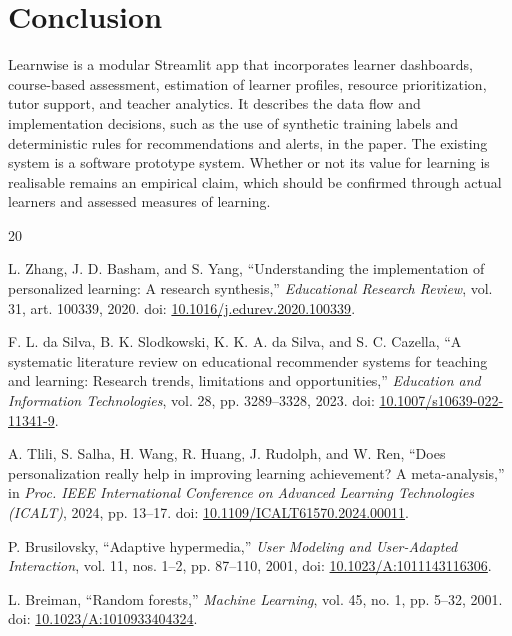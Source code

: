 \documentclass[conference]{IEEEtran}
\begin{document}
\section{Conclusion}
Learnwise is a modular Streamlit app that incorporates learner dashboards, course-based assessment, estimation of learner profiles, resource prioritization, tutor support, and teacher analytics. It describes the data flow and implementation decisions, such as the use of synthetic training labels and deterministic rules for recommendations and alerts, in the paper. The existing system is a software prototype system. Whether or not its value for learning is realisable remains an empirical claim, which should be confirmed through actual learners and assessed measures of learning.



\begin{thebibliography}{20}

L. Zhang, J. D. Basham, and S. Yang, ``Understanding the implementation of personalized learning: A research synthesis,'' \textit{Educational Research Review}, vol. 31, art. 100339, 2020. doi: \href{https://doi.org/10.1016/j.edurev.2020.100339}{10.1016/j.edurev.2020.100339}.

F. L. da Silva, B. K. Slodkowski, K. K. A. da Silva, and S. C. Cazella, ``A systematic literature review on educational recommender systems for teaching and learning: Research trends, limitations and opportunities,'' \textit{Education and Information Technologies}, vol. 28, pp. 3289--3328, 2023. doi: \href{https://doi.org/10.1007/s10639-022-11341-9}{10.1007/s10639-022-11341-9}.

A. Tlili, S. Salha, H. Wang, R. Huang, J. Rudolph, and W. Ren, ``Does personalization really help in improving learning achievement? A meta-analysis,'' in \textit{Proc. IEEE International Conference on Advanced Learning Technologies (ICALT)}, 2024, pp. 13--17. doi: \href{https://doi.org/10.1109/ICALT61570.2024.00011}{10.1109/ICALT61570.2024.00011}.

P. Brusilovsky, ``Adaptive hypermedia,'' \textit{User Modeling and User-Adapted Interaction}, vol. 11, nos. 1--2, pp. 87--110, 2001, doi: \href{https://doi.org/10.1023/A:1011143116306}{10.1023/A:1011143116306}.

L. Breiman, ``Random forests,'' \textit{Machine Learning}, vol. 45, no. 1, pp. 5--32, 2001. doi: \href{https://doi.org/10.1023/A:1010933404324}{10.1023/A:1010933404324}.


\end{thebibliography}
\end{document}
